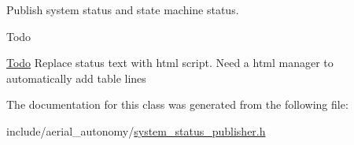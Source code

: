 Publish system status and state machine status. 

\begin{DoxyRefDesc}{Todo}
\item[\hyperlink{todo__todo000013}{Todo}]Replace status text with html script. Need a html manager to automatically add table lines \end{DoxyRefDesc}


The documentation for this class was generated from the following file\-:\begin{DoxyCompactItemize}
\item 
include/aerial\-\_\-autonomy/\hyperlink{system__status__publisher_8h}{system\-\_\-status\-\_\-publisher.\-h}\end{DoxyCompactItemize}
